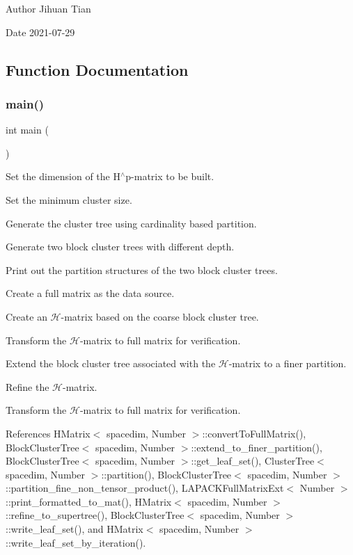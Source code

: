 \begin{DoxyAuthor}{Author}
Jihuan Tian 
\end{DoxyAuthor}
\begin{DoxyDate}{Date}
2021-\/07-\/29 
\end{DoxyDate}


\subsection{Function Documentation}
\mbox{\label{hmatrix-refinement_8cc_ae66f6b31b5ad750f1fe042a706a4e3d4}} 
\subsubsection{\texorpdfstring{main()}{main()}}
{\footnotesize\ttfamily int main (\begin{DoxyParamCaption}{ }\end{DoxyParamCaption})}

Set the dimension of the H$^\wedge$p-\/matrix to be built.

Set the minimum cluster size.

Generate the cluster tree using cardinality based partition.

Generate two block cluster trees with different depth.

Print out the partition structures of the two block cluster trees.

Create a full matrix as the data source.

Create an $\mathcal{H}$-\/matrix based on the coarse block cluster tree.

Transform the $\mathcal{H}$-\/matrix to full matrix for verification.

Extend the block cluster tree associated with the $\mathcal{H}$-\/matrix to a finer partition.

Refine the $\mathcal{H}$-\/matrix.

Transform the $\mathcal{H}$-\/matrix to full matrix for verification.

References H\+Matrix$<$ spacedim, Number $>$\+::convert\+To\+Full\+Matrix(), Block\+Cluster\+Tree$<$ spacedim, Number $>$\+::extend\+\_\+to\+\_\+finer\+\_\+partition(), Block\+Cluster\+Tree$<$ spacedim, Number $>$\+::get\+\_\+leaf\+\_\+set(), Cluster\+Tree$<$ spacedim, Number $>$\+::partition(), Block\+Cluster\+Tree$<$ spacedim, Number $>$\+::partition\+\_\+fine\+\_\+non\+\_\+tensor\+\_\+product(), L\+A\+P\+A\+C\+K\+Full\+Matrix\+Ext$<$ Number $>$\+::print\+\_\+formatted\+\_\+to\+\_\+mat(), H\+Matrix$<$ spacedim, Number $>$\+::refine\+\_\+to\+\_\+supertree(), Block\+Cluster\+Tree$<$ spacedim, Number $>$\+::write\+\_\+leaf\+\_\+set(), and H\+Matrix$<$ spacedim, Number $>$\+::write\+\_\+leaf\+\_\+set\+\_\+by\+\_\+iteration().

